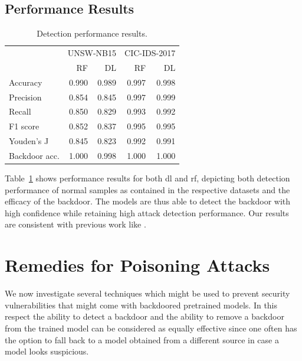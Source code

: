 \documentclass[10pt,sigconf,letterpaper,dvipsnames]{acmart}
\newcommand{\unsw}{UNSW-NB15}
\newcommand{\cic}{CIC-IDS-2017}
\begin{document}
\subsection{Performance Results}
\begin{table}[t]
\caption{Detection performance results.} \label{tab:performance_results}
\begin{tabular}{l r r r r} \toprule
& \multicolumn{2}{r}{\unsw{}} & \multicolumn{2}{r}{\cic{}} \\
& RF & DL & RF & DL \\ \midrule
Accuracy	& 0.990 & 0.989 & 0.997 & 0.998\\
Precision	& 0.854 & 0.845 & 0.997 & 0.999\\
Recall	& 0.850 & 0.829 & 0.993 & 0.992\\
F1 score	& 0.852 & 0.837 & 0.995 & 0.995\\
Youden's J	& 0.845 & 0.823 & 0.992 & 0.991\\
Backdoor acc.	& 1.000 & 0.998 & 1.000 & 1.000\\
\bottomrule
\end{tabular}
\end{table}
Table~\ref{tab:performance_results} shows performance results for both \gls{dl} and \gls{rf}, depicting both detection performance of normal samples as contained in the respective datasets and the efficacy of the backdoor. The models are thus able to detect the backdoor with high confidence while retaining high attack detection performance.
Our results are consistent with previous work like \cite{meghdouri_analysis_2018}.

\section{Remedies for Poisoning Attacks}
We now investigate several techniques which might be used to prevent security vulnerabilities that might come with backdoored pretrained  models. In this respect the ability to detect a backdoor and the ability to remove a backdoor from the trained model can be considered as equally effective since one often has the option to fall back to a model obtained from a different source in case a model looks suspicious.
\end{document}
